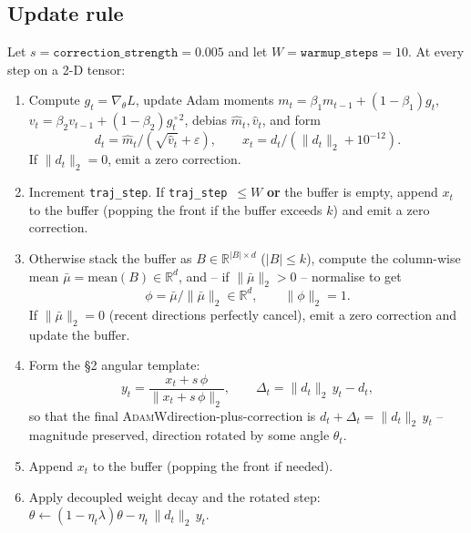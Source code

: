 \documentclass{article}
\newcommand{\Adamw}{\textsc{AdamW}}
\begin{document}
\subsection{Update rule}
Let $s = \texttt{correction\_strength} = 0.005$ and let
$W = \texttt{warmup\_steps} = 10$.  At every step on a 2-D tensor:
\begin{enumerate}
  \item Compute $g_t = \nabla_\theta L$, update Adam moments
        $m_t = \beta_1 m_{t-1} + (1-\beta_1) g_t$,
        $v_t = \beta_2 v_{t-1} + (1-\beta_2) g_t^{\!\circ 2}$,
        debias $\hat m_t, \hat v_t$, and form
        \begin{equation}
        d_t = \hat m_t / (\sqrt{\hat v_t} + \varepsilon), \qquad
        x_t = d_t / (\|d_t\|_2 + 10^{-12}).
        \label{eq:adamw}
        \end{equation}
        If $\|d_t\|_2 = 0$, emit a zero correction.
  \item Increment \texttt{traj\_step}.  If
        \texttt{traj\_step}~$\le W$ \textbf{or} the buffer is empty,
        append $x_t$ to the buffer (popping the front if the buffer
        exceeds $k$) and emit a zero correction.
  \item Otherwise stack the buffer as $B \in \mathbb{R}^{|B|\times d}$
        ($|B| \le k$), compute the column-wise mean
        $\bar\mu = \mathrm{mean}(B) \in \mathbb{R}^d$, and -- if
        $\|\bar\mu\|_2 > 0$ -- normalise to get
        \begin{equation}
        \phi = \bar\mu / \|\bar\mu\|_2 \in \mathbb{R}^d, \qquad
        \|\phi\|_2 = 1.
        \label{eq:phi}
        \end{equation}
        If $\|\bar\mu\|_2 = 0$ (recent directions perfectly cancel),
        emit a zero correction and update the buffer.
  \item Form the §2 angular template:
        \begin{equation}
        y_t = \frac{x_t + s\,\phi}{\|x_t + s\,\phi\|_2}, \qquad
        \Delta_t = \|d_t\|_2\, y_t - d_t,
        \label{eq:angular}
        \end{equation}
        so that the final \Adamw\-direction-plus-correction is
        $d_t + \Delta_t = \|d_t\|_2\,y_t$ -- magnitude preserved,
        direction rotated by some angle $\theta_t$.
  \item Append $x_t$ to the buffer (popping the front if needed).
  \item Apply decoupled weight decay and the rotated step:
        $\theta \leftarrow (1-\eta_t \lambda)\theta - \eta_t\,
        \|d_t\|_2\, y_t$.
\end{enumerate}
\end{document}
